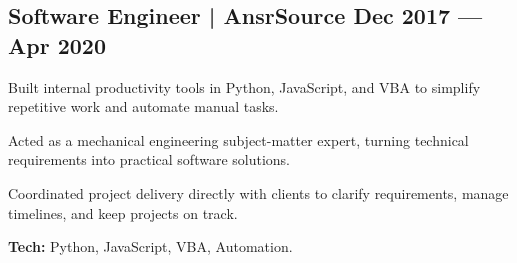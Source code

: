 \subsection[Software Engineer | AnsrSource (Dec 2017 --- Apr 2020)]{Software Engineer | AnsrSource \texorpdfstring{\hfill}{ } Dec 2017 --- Apr 2020}
\begin{zitemize}
    \item Built internal productivity tools in Python, JavaScript, and VBA to simplify repetitive work and automate manual tasks.
    \item Acted as a mechanical engineering subject-matter expert, turning technical requirements into practical software solutions.
    \item Coordinated project delivery directly with clients to clarify requirements, manage timelines, and keep projects on track.
    \item \textbf{Tech:} Python, JavaScript, VBA, Automation.
\end{zitemize}
